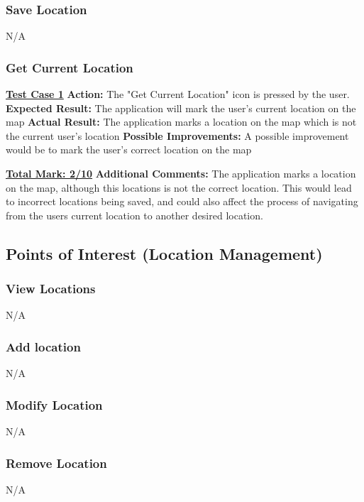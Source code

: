 \documentclass[english]{article}
\begin{document}
\subsubsection{Save Location}
N/A

\subsubsection{Get Current Location}
\textbf{\underline{Test Case 1}}\newline
\textbf{Action:} The "Get Current Location" icon is pressed by the user.\newline
\textbf{Expected Result:} The application will mark the user's current location on the map\newline
\textbf{Actual Result:} The application marks a location on the map which is not the current user's location\newline
\textbf{Possible Improvements:} A possible improvement would be to mark the user's correct location on the map\newline

\textbf{\underline{Total Mark: 2/10}}\newline
\textbf{Additional Comments:} The application marks a location on the map, although this locations is not the correct location. This would lead to incorrect locations being saved, and could also affect the process of navigating from the users current location to another desired location.\newline


\subsection{Points of Interest (Location Management)}

\subsubsection{View Locations}
N/A
\subsubsection{Add location}
N/A
\subsubsection{Modify Location}
N/A
\subsubsection{Remove Location}
N/A
\end{document}
